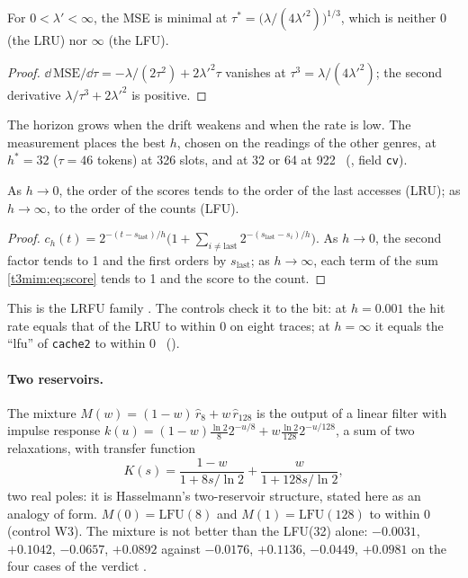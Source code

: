 \begin{proposition}\label{t3mim:prop:horizon}
For $0 < \lambda' < \infty$, the MSE is minimal at $\tau^\ast = \bigl(\lambda/(4\lambda'^2)\bigr)^{1/3}$, which is neither $0$ (the LRU) nor $\infty$ (the LFU).
\end{proposition}
\begin{proof}
$\dd\,\mathrm{MSE}/\dd\tau = -\lambda/(2\tau^2) + 2\lambda'^2\tau$ vanishes at $\tau^3 = \lambda/(4\lambda'^2)$; the second derivative $\lambda/\tau^3 + 2\lambda'^2$ is positive.
\end{proof}
The horizon grows when the drift weakens and when the rate is low. The measurement places the best $h$, chosen on the readings of the other genres, at $h^\ast = 32$ ($\tau = 46$ tokens) at 326 slots, and at 32 or 64 at 922 \mes~(, field \texttt{cv}).

\begin{proposition}\label{t3mim:prop:continuum}
As $h \to 0$, the order of the scores tends to the order of the last accesses (LRU); as $h \to \infty$, to the order of the counts (LFU).
\end{proposition}
\begin{proof}
$c_h(t) = 2^{-(t - s_{\text{last}})/h}\bigl(1 + \sum_{i \ne \text{last}} 2^{-(s_{\text{last}} - s_i)/h}\bigr)$. As $h \to 0$, the second factor tends to 1 and the first orders by $s_{\text{last}}$; as $h \to \infty$, each term of the sum \eqref{t3mim:eq:score} tends to 1 and the score to the count.
\end{proof}
This is the LRFU family \cite{lee2001lrfu}. The controls check it to the bit: at $h = 0.001$ the hit rate equals that of the LRU to within 0 on eight traces; at $h = \infty$ it equals the ``lfu'' of \texttt{cache2} to within 0 \mes~().

\paragraph{Two reservoirs.} The mixture $M(w) = (1-w)\,\hat r_8 + w\,\hat r_{128}$ is the output of a linear filter with impulse response $k(u) = (1-w)\tfrac{\ln 2}{8}2^{-u/8} + w\tfrac{\ln 2}{128}2^{-u/128}$, a sum of two relaxations, with transfer function
\begin{equation}\label{t3mim:eq:transfert}
K(s) = \frac{1-w}{1 + 8s/\ln 2} + \frac{w}{1 + 128 s/\ln 2},
\end{equation}
two real poles: it is Hasselmann's two-reservoir structure, stated here as an analogy of form. $M(0) = \mathrm{LFU}(8)$ and $M(1) = \mathrm{LFU}(128)$ to within 0 (control W3). The mixture is not better than the LFU(32) alone: $-0.0031$, $+0.1042$, $-0.0657$, $+0.0892$ against $-0.0176$, $+0.1136$, $-0.0449$, $+0.0981$ on the four cases of the verdict \mes.


